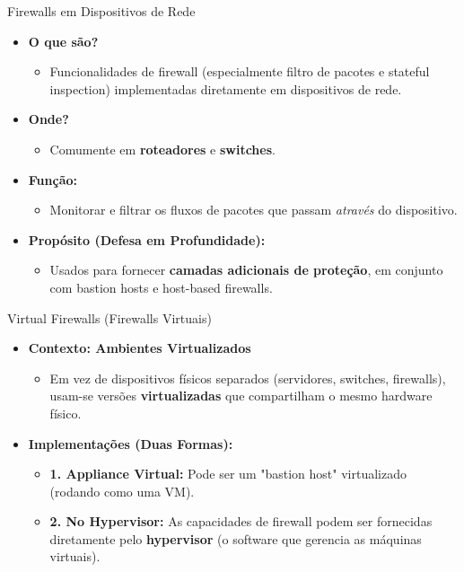 \begin{frame}{Firewalls em Dispositivos de Rede}
    \begin{itemize}
        \item \textbf{O que são?}
              \begin{itemize}
                  \item Funcionalidades de firewall (especialmente filtro de pacotes e stateful inspection) implementadas diretamente em dispositivos de rede.
              \end{itemize}

        \item \textbf{Onde?}
              \begin{itemize}
                  \item Comumente em \textbf{roteadores} e \textbf{switches}.
              \end{itemize}

        \item \textbf{Função:}
              \begin{itemize}
                  \item Monitorar e filtrar os fluxos de pacotes que passam \textit{através} do dispositivo.
              \end{itemize}

        \item \textbf{Propósito (Defesa em Profundidade):}
              \begin{itemize}
                  \item Usados para fornecer \textbf{camadas adicionais de proteção}, em conjunto com bastion hosts e host-based firewalls.
              \end{itemize}
    \end{itemize}
\end{frame}

\begin{frame}{Virtual Firewalls (Firewalls Virtuais)}
    \begin{itemize}
        \item \textbf{Contexto: Ambientes Virtualizados}
              \begin{itemize}
                  \item Em vez de dispositivos físicos separados (servidores, switches, firewalls), usam-se versões \textbf{virtualizadas} que compartilham o mesmo hardware físico.
              \end{itemize}

        \item \textbf{Implementações (Duas Formas):}
              \begin{itemize}
                  \item \textbf{1. Appliance Virtual:} Pode ser um "bastion host" virtualizado (rodando como uma VM).
                  \item \textbf{2. No Hypervisor:} As capacidades de firewall podem ser fornecidas diretamente pelo \textbf{hypervisor} (o software que gerencia as máquinas virtuais).
              \end{itemize}
    \end{itemize}
\end{frame}

